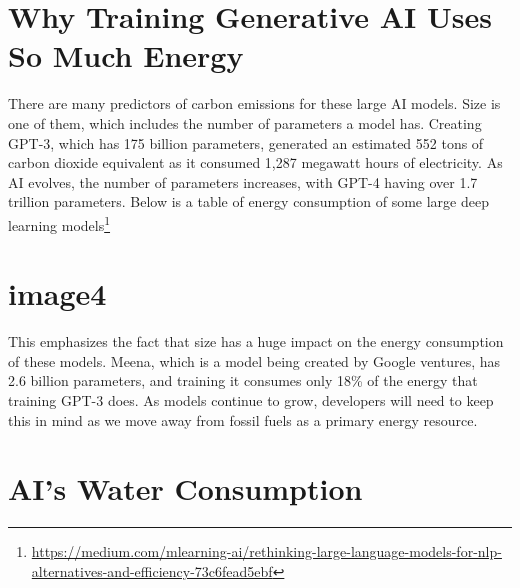 \documentclass[
]{book}
\begin{document}
\hypertarget{why-training-generative-ai-uses-so-much-energy}{%
\section{Why Training Generative AI Uses So Much Energy}\label{why-training-generative-ai-uses-so-much-energy}}

There are many predictors of carbon emissions for these large AI models. Size is one of them, which includes the number of parameters a model has. Creating GPT-3, which has 175 billion parameters, generated an estimated 552 tons of carbon dioxide equivalent as it consumed 1,287 megawatt hours of electricity. As AI evolves, the number of parameters increases, with GPT-4 having over 1.7 trillion parameters. Below is a table of energy consumption of some large deep learning models\footnote{\url{https://medium.com/mlearning-ai/rethinking-large-language-models-for-nlp-alternatives-and-efficiency-73c6fead5ebf}}

\hypertarget{image4}{%
\section{image4}\label{image4}}

This emphasizes the fact that size has a huge impact on the energy consumption of these models. Meena, which is a model being created by Google ventures, has 2.6 billion parameters, and training it consumes only 18\% of the energy that training GPT-3 does. As models continue to grow, developers will need to keep this in mind as we move away from fossil fuels as a primary energy resource.

\hypertarget{ais-water-consumption}{%
\section{AI's Water Consumption}\label{ais-water-consumption}}
\end{document}
